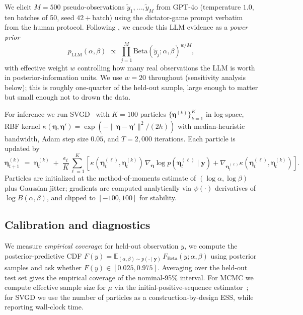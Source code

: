 \documentclass[11pt]{article}
\newcommand{\bsy}{\bm{y}}
\newcommand{\Beta}{\mathrm{Beta}}
\begin{document}
We elicit $M=500$ pseudo-observations $\tilde{y}_1, \ldots, \tilde{y}_M$ from GPT-4o
(temperature $1.0$, ten batches of 50, seed $42+\text{batch}$) using the dictator-game
prompt verbatim from the human protocol. Following \citet{ibrahim2000power}, we encode
this LLM evidence as a \emph{power prior}
\begin{equation}
  p_{\mathrm{LLM}}(\alpha, \beta) \;\propto\; \prod_{j=1}^{M} \Beta(\tilde{y}_j; \alpha, \beta)^{w/M},
  \label{eq:powerprior}
\end{equation}
with effective weight $w$ controlling how many real observations the LLM is worth in
posterior-information units. We use $w=20$ throughout (sensitivity analysis below);
this is roughly one-quarter of the held-out sample, large enough to matter but small enough
not to drown the data.

For inference we run SVGD~\citep{liu2016stein} with $K = 100$ particles
$\{\bm{\eta}^{(k)}\}_{k=1}^K$ in log-space, RBF kernel
$\kappa(\bm{\eta}, \bm{\eta}') = \exp\!\left(-\|\bm{\eta} - \bm{\eta}'\|^2/(2h)\right)$ with
median-heuristic bandwidth, Adam step size $0.05$, and $T = 2{,}000$ iterations. Each
particle is updated by
\begin{equation}
  \bm{\eta}^{(k)}_{t+1} \;=\; \bm{\eta}^{(k)}_t \;+\; \frac{\epsilon_t}{K}\sum_{\ell=1}^{K}
  \!\left[\kappa(\bm{\eta}^{(\ell)}_t, \bm{\eta}^{(k)}_t)\, \nabla_{\bm{\eta}} \log p(\bm{\eta}^{(\ell)}_t \mid \bsy)
  + \nabla_{\bm{\eta}^{(\ell)}_t} \kappa(\bm{\eta}^{(\ell)}_t, \bm{\eta}^{(k)}_t)\right].
  \label{eq:svgd}
\end{equation}
Particles are initialized at the method-of-moments estimate of $(\log\alpha, \log\beta)$
plus Gaussian jitter; gradients are computed analytically via $\psi(\cdot)$ derivatives of
$\log B(\alpha,\beta)$, and clipped to $[-100, 100]$ for stability.

\subsection{Calibration and diagnostics}

We measure \emph{empirical coverage}: for held-out observation $y$, we compute the
posterior-predictive CDF $F(y) = \mathbb{E}_{(\alpha,\beta) \sim p(\cdot\mid\bsy)}\,F_{\Beta}(y; \alpha,\beta)$
using posterior samples and ask whether $F(y) \in [0.025, 0.975]$. Averaging over the held-out
test set gives the empirical coverage of the nominal-95\% interval.
For MCMC we compute effective sample size for $\mu$ via the initial-positive-sequence
estimator~\citep{geyer1992practical}; for SVGD we use the number of particles as a
construction-by-design ESS, while reporting wall-clock time.
\end{document}
